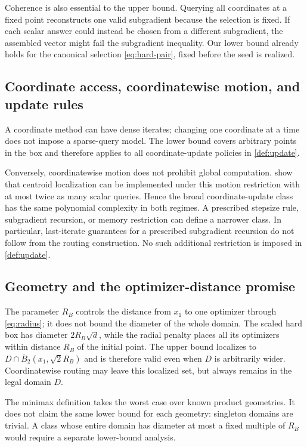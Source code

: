 \documentclass[11pt]{article}
\numberwithin{equation}{section}
\theoremstyle{definition}
\theoremstyle{remark}
\begin{document}
Coherence is also essential to the upper bound. Querying all coordinates at a fixed point reconstructs one valid subgradient because the selection is fixed. If each scalar answer could instead be chosen from a different subgradient, the assembled vector might fail the subgradient inequality. Our lower bound already holds for the canonical selection \eqref{eq:hard-pair}, fixed before the seed is realized.

\subsection{Coordinate access, coordinatewise motion, and update rules}

A coordinate method can have dense iterates; changing one coordinate at a time does not impose a sparse-query model. The lower bound covers arbitrary points in the box and therefore applies to all coordinate-update policies in \cref{def:update}.

Conversely, coordinatewise motion does not prohibit global computation.  show that centroid localization can be implemented under this motion restriction with at most twice as many scalar queries. Hence the broad coordinate-update class has the same polynomial complexity in both regimes. A prescribed stepsize rule, subgradient recursion, or memory restriction can define a narrower class. In particular, last-iterate guarantees for a prescribed subgradient recursion do not follow from the routing construction. No such additional restriction is imposed in \cref{def:update}.

\subsection{Geometry and the optimizer-distance promise}

The parameter $R_B$ controls the distance from $x_1$ to one optimizer through \eqref{eq:radius}; it does not bound the diameter of the whole domain. The scaled hard box has diameter $2R_B\sqrt d$, while the radial penalty places all its optimizers within distance $R_B$ of the initial point. The upper bound localizes to $D\cap\overline B_2(x_1,\sqrt2R_B)$ and is therefore valid even when $D$ is arbitrarily wider. Coordinatewise routing may leave this localized set, but always remains in the legal domain $D$.

The minimax definition takes the worst case over known product geometries. It does not claim the same lower bound for each geometry: singleton domains are trivial. A class whose entire domain has diameter at most a fixed multiple of $R_B$ would require a separate lower-bound analysis.
\end{document}
